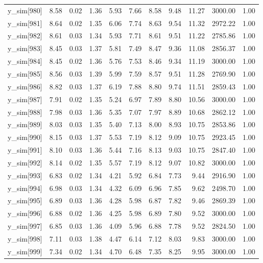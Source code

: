 \begin{table}[ht]
\begin{tabular}{rrrrrrrrrrr}
  y\_sim[980] & 8.58 & 0.02 & 1.36 & 5.93 & 7.66 & 8.58 & 9.48 & 11.27 & 3000.00 & 1.00 \\ 
  y\_sim[981] & 8.64 & 0.02 & 1.35 & 6.06 & 7.74 & 8.63 & 9.54 & 11.32 & 2972.22 & 1.00 \\ 
  y\_sim[982] & 8.61 & 0.03 & 1.34 & 5.93 & 7.71 & 8.61 & 9.51 & 11.22 & 2785.86 & 1.00 \\ 
  y\_sim[983] & 8.45 & 0.03 & 1.37 & 5.81 & 7.49 & 8.47 & 9.36 & 11.08 & 2856.37 & 1.00 \\ 
  y\_sim[984] & 8.45 & 0.02 & 1.36 & 5.76 & 7.53 & 8.46 & 9.34 & 11.19 & 3000.00 & 1.00 \\ 
  y\_sim[985] & 8.56 & 0.03 & 1.39 & 5.99 & 7.59 & 8.57 & 9.51 & 11.28 & 2769.90 & 1.00 \\ 
  y\_sim[986] & 8.82 & 0.03 & 1.37 & 6.19 & 7.88 & 8.80 & 9.74 & 11.51 & 2859.43 & 1.00 \\ 
  y\_sim[987] & 7.91 & 0.02 & 1.35 & 5.24 & 6.97 & 7.89 & 8.80 & 10.56 & 3000.00 & 1.00 \\ 
  y\_sim[988] & 7.98 & 0.03 & 1.36 & 5.35 & 7.07 & 7.97 & 8.89 & 10.68 & 2862.12 & 1.00 \\ 
  y\_sim[989] & 8.03 & 0.03 & 1.35 & 5.40 & 7.13 & 8.00 & 8.93 & 10.75 & 2853.86 & 1.00 \\ 
  y\_sim[990] & 8.15 & 0.03 & 1.37 & 5.53 & 7.19 & 8.12 & 9.09 & 10.75 & 2923.45 & 1.00 \\ 
  y\_sim[991] & 8.10 & 0.03 & 1.36 & 5.44 & 7.16 & 8.13 & 9.03 & 10.75 & 2847.40 & 1.00 \\ 
  y\_sim[992] & 8.14 & 0.02 & 1.35 & 5.57 & 7.19 & 8.12 & 9.07 & 10.82 & 3000.00 & 1.00 \\ 
  y\_sim[993] & 6.83 & 0.02 & 1.34 & 4.21 & 5.92 & 6.84 & 7.73 & 9.44 & 2916.90 & 1.00 \\ 
  y\_sim[994] & 6.98 & 0.03 & 1.34 & 4.32 & 6.09 & 6.96 & 7.85 & 9.62 & 2498.70 & 1.00 \\ 
  y\_sim[995] & 6.89 & 0.03 & 1.36 & 4.28 & 5.98 & 6.87 & 7.82 & 9.46 & 2869.39 & 1.00 \\ 
  y\_sim[996] & 6.88 & 0.02 & 1.36 & 4.25 & 5.98 & 6.89 & 7.80 & 9.52 & 3000.00 & 1.00 \\ 
  y\_sim[997] & 6.85 & 0.03 & 1.36 & 4.09 & 5.96 & 6.88 & 7.78 & 9.52 & 2824.50 & 1.00 \\ 
  y\_sim[998] & 7.11 & 0.03 & 1.38 & 4.47 & 6.14 & 7.12 & 8.03 & 9.83 & 3000.00 & 1.00 \\ 
  y\_sim[999] & 7.34 & 0.02 & 1.34 & 4.70 & 6.48 & 7.35 & 8.25 & 9.95 & 3000.00 & 1.00 \\ 

\end{tabular}
\end{table}
